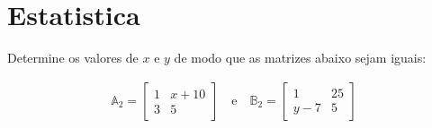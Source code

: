 \part{Estatistica}
\begin{exercise}
	Determine os valores de $x$ e $y$ de modo que as matrizes abaixo sejam iguais:
	
	\begin{ceqn}
		\begin{align*}
		\mathbb{A}_{2}=\begin{bmatrix}1 & x+10 \\ 3 & 5 \end{bmatrix} \quad \mathrm{e} \quad \mathbb{B}_{2}=\begin{bmatrix}1 & 25 \\ y-7 & 5 \end{bmatrix}
		\end{align*}
	\end{ceqn}
\end{exercise}

